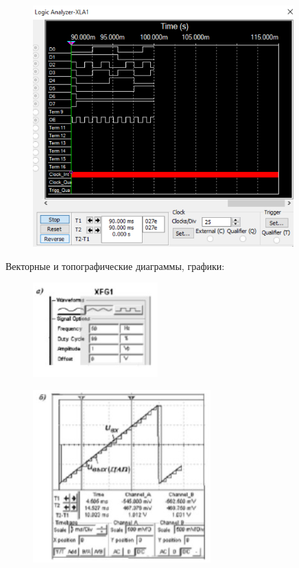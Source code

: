 \documentclass[spec, och, labwork]{shiza}
\begin{document}
\begin{figure}[H]
    \centering
    \includegraphics[width=3.95833in,height=3.66667in]{image4.png}
\end{figure}

Векторные и топографические диаграммы, графики:

\begin{figure}[H]
    \centering
    \includegraphics[width=1.89583in,height=1.4375in]{image5.png}
\end{figure}

\begin{figure}[H]
    \centering
    \includegraphics[width=2.69792in,height=2.625in]{image6.png}
\end{figure}
\end{document}
